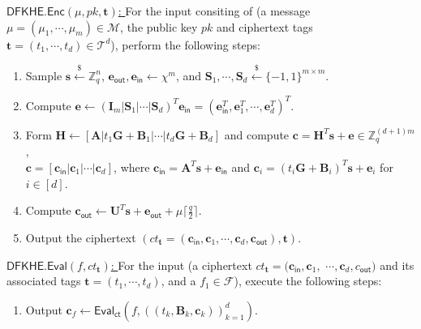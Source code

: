 \documentclass[runningheads,10pt]{llncs}
\begin{document}
\begin{description}
	
	
\item \underline{$\textsf{DFKHE.Enc}(\mu,  pk, \mathbf{t})$: }
	For the input consiting of (a message $\mu=(\mu_1, \cdots, \mu_m)\in \mathcal{M}$,  the public key $pk$ and ciphertext tags $\mathbf{t}=(t_1, \cdots, t_d) \in \mathcal{T}^d$), 
	perform the following steps:
	\begin{enumerate}
		\item Sample $\textbf{s} \xleftarrow{\$}\mathbb{Z}_q^{n}$, $\mathbf{e}_{\textsf{out}} , \textbf{e}_\textsf{in} \leftarrow \chi^m$, and $\textbf{S}_1, \cdots, \textbf{S}_{d} \xleftarrow{\$} \{-1,1\}^{m \times m}$.
		\item Compute $\textbf{e}\leftarrow (\textbf{I}_m|\textbf{S}_1|\cdots|\textbf{S}_{d})^T\textbf{e}_\textsf{in}=(\textbf{e}_{ \textsf{in}}^T, \textbf{e}_{1}^T, \cdots, \textbf{e}_{d}^T)^T $.
		\item Form $\textbf{H}\leftarrow [\textbf{A}|t_1\textbf{G}+\textbf{B}_1|\cdots |t_d \textbf{G}+\textbf{B}_d]$ 
		and compute $\textbf{c}=\textbf{H}^T\textbf{s}+\textbf{e} \in \mathbb{Z}_q^{(d+1)m}$ ,\\
		$\textbf{c}=[\textbf{c}_\textsf{in}|\textbf{c}_1|\cdots |\textbf{c}_d]$, where $\textbf{c}_{\textsf{in}}=\textbf{A}^T \textbf{s}+\textbf{e}_{\textsf{in}}$
		and  $\textbf{c}_{i}=(t_i\textbf{G}+\textbf{B}_i)^T \textbf{s}+\textbf{e}_{i}$ for $i\in [d]$.
		\item Compute $\textbf{c}_{\textsf{out}} \leftarrow \textbf{U}^T \textbf{s}+\textbf{e}_{\textsf{out}}+\mu \lceil \frac{q}{2} \rceil$.
		\item Output the ciphertext $(ct_\mathbf{t}= (\textbf{c}_{\textsf{in}}, \textbf{c}_1, \cdots, \textbf{c}_d, \textbf{c}_{\textsf{out}}), \mathbf{t}) $.
	\end{enumerate}
	
\iffalse
	\item \underline{$\textsf{DFKHE.Eval}(f, ct_\mathbf{t})$: }
	For the input (a ciphertext $ct_\mathbf{t}=(\textbf{c}_{\textsf{in}}, \textbf{c}_1, $ $ \cdots, \textbf{c}_{d}, c_{\textsf{out}}) $ and its associated tags $\textbf{t}=(t_1, \cdots, t_d)$, 
	and a $f_1 \in \mathcal{F}$), execute the following steps:
	\begin{enumerate}
	
		\item Output $\textbf{c}_f\leftarrow \textsf{Eval}_\textsf{ct}(f,  ((t_k, \textbf{B}_k, \textbf{c}_{k}))_{k=1}^{d})$.
	\end{enumerate}  


\end{description}
\end{document}
